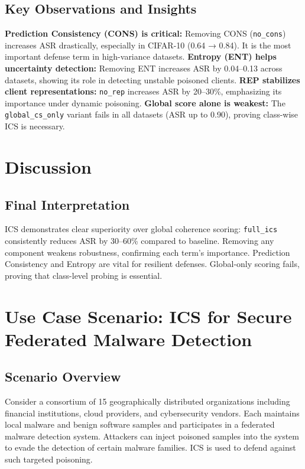 \documentclass[conference]{IEEEtran}
\begin{document}
\subsection{Key Observations and Insights}
\textbf{Prediction Consistency (CONS) is critical:} Removing CONS (\texttt{no\_cons}) increases ASR drastically, especially in CIFAR-10 (0.64 → 0.84). It is the most important defense term in high-variance datasets. \textbf{Entropy (ENT) helps uncertainty detection:} Removing ENT increases ASR by 0.04–0.13 across datasets, showing its role in detecting unstable poisoned clients. \textbf{REP stabilizes client representations:} \texttt{no\_rep} increases ASR by 20–30\%, emphasizing its importance under dynamic poisoning. \textbf{Global score alone is weakest:} The \texttt{global\_cs\_only} variant fails in all datasets (ASR up to 0.90), proving class-wise ICS is necessary.

\section{Discussion}

\subsection{Final Interpretation}
ICS demonstrates clear superiority over global coherence scoring: \texttt{full\_ics} consistently reduces ASR by 30–60\% compared to baseline. Removing any component weakens robustness, confirming each term's importance. Prediction Consistency and Entropy are vital for resilient defenses. Global-only scoring fails, proving that class-level probing is essential.

\section{Use Case Scenario: ICS for Secure Federated Malware Detection}
\label{sec:usecase_scenario}

\subsection{Scenario Overview}
Consider a consortium of 15 geographically distributed organizations including financial institutions, cloud providers, and cybersecurity vendors. Each maintains local malware and benign software samples and participates in a federated malware detection system. Attackers can inject poisoned samples into the system to evade the detection of certain malware families. ICS is used to defend against such targeted poisoning.
\end{document}
